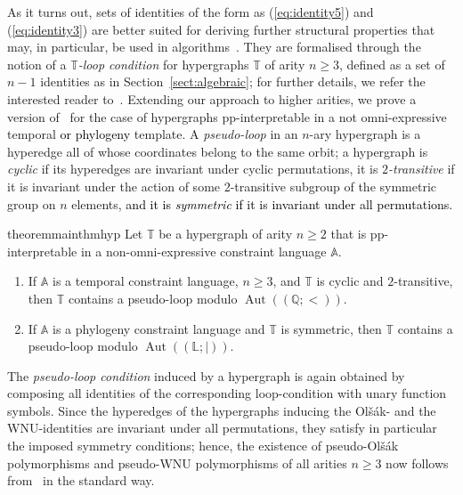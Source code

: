 \documentclass[a4paper,reqno, cleveref]{amsart}
\newcommand{\Q}{\mathbb{Q}}
\newcommand{\ignore}[1]{}
\newcommand{\struct}[1]{\mathbb{#1}}
\DeclareMathOperator{\Aut}{Aut}
\newcommand{\sA}{\mathbb A}
\newcommand{\sT}{\mathbb T}
\newcommand{\Phylo}[1]{\ensuremath{(\struct{L};|)}#1}
\newcommand\jo[1]{\textcolor{black}{#1}} %
\begin{document}
 
As it turns out, sets of identities of the form as (\ref{eq:identity5}) and (\ref{eq:identity3}) are better suited for deriving further structural properties  that may,  in particular, be used in algorithms~\cite{BoundedWidth,BoundedWidthJournal,Bulatov,ZhukFVConjecture,Zhuk20,MottetPinskerSmooth,SmoothapproxJACM,CSPandchoice,algebraicity}. They are formalised through the notion of a \emph{$\sT$-loop condition} for hypergraphs $\sT$ of arity $n\geq 3$,  defined as a set of $n-1$ identities as in Section~\ref{sect:algebraic}; for further details, we refer the interested reader to~\cite{Pseudo-loop}.
%
%
  Extending our approach  to higher arities, we prove
 a version of~ for the case of %
hypergraphs pp-interpretable in a not omni-expressive temporal \jo{or phylogeny} template. A \emph{pseudo-loop} in an $n$-ary hypergraph is a hyperedge all of whose coordinates belong to the same orbit; a hypergraph is \emph{cyclic} if its hyperedges are invariant under cyclic permutations, it is \emph{$2$-transitive} if it is invariant under the action of some $2$-transitive subgroup of the symmetric group on $n$ elements, \jo{and it is \emph{symmetric} if it is invariant under all permutations.} 
%
 

\begin{restatable}{theorem}{mainthmhyp}\label{theorem:mainthmhyp} Let $\sT$ be a hypergraph of arity $n\geq 2$ that is pp-interpretable in a non-omni-expressive constraint language $\sA$. \begin{enumerate}
    \item\label{item:thmhyptemp} If $\sA$ is a temporal constraint language, $n \geq 3$, and $\sT$ is cyclic and $2$-transitive, then $\sT$ contains a pseudo-loop modulo $\Aut((\Q;<))$.
    \item\label{item:thmhypphylo} If $\sA$ is a phylogeny constraint language and $\sT$ is symmetric, then $\sT$ contains a pseudo-loop modulo $\Aut(\Phylo)$.
    \ignore{\item If $\sA$ is a phylogeny constraint language, $n=2$, and $\sT$ contains a symmetric edge, then $\sT$ contains a pseudo-loop modulo $\Aut(\Phylo)$.}
\end{enumerate} 
\end{restatable}


%

The \emph{pseudo-loop condition} induced by a hypergraph is again obtained by composing all identities of the corresponding loop-condition with unary function symbols.
Since the hyperedges of the hypergraphs inducing the Ol\v{s}\'ak- and the WNU-identities are invariant under all permutations, they satisfy in particular the imposed symmetry conditions; hence, 
 the existence of pseudo-Ol\v{s}\'ak polymorphisms and pseudo-WNU polymorphisms of all arities $n \geq 3$ now follows from~ in the standard way.
\end{document}
